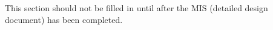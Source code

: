 \documentclass[12pt, titlepage]{article}
\begin{document}
This section should not be filled in until after the MIS (detailed design
  document) has been completed.








\end{document}
